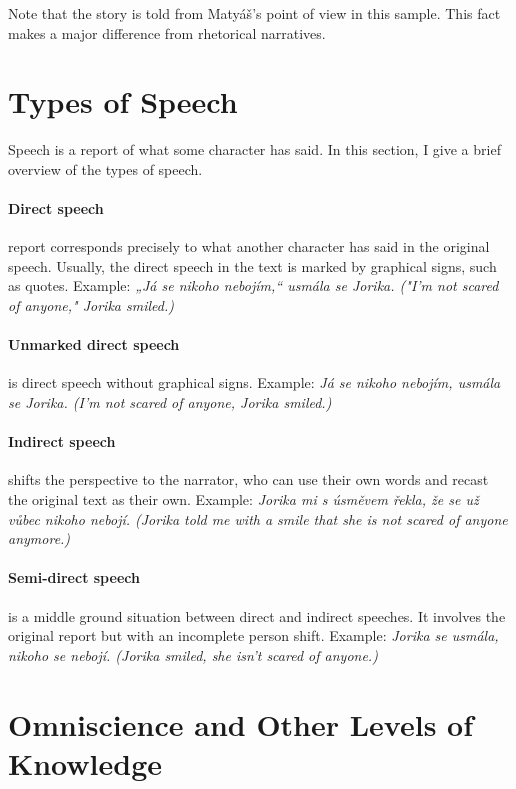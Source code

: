 Note that the story is told from Matyáš's point of view in this sample. This fact makes a major difference from rhetorical narratives.

\section{Types of Speech} \label{sec:speeches}

Speech is a report of what some character has said. In this section, I give a brief overview of the types of speech.

\paragraph{Direct speech} report corresponds precisely to what another character has said in the original speech. \cite{ChapterNine} Usually, the direct speech in the text is marked by graphical signs, such as quotes. Example: \emph{„Já se nikoho nebojím,“ usmála se Jorika. ("I'm not scared of anyone," Jorika smiled.)}

\paragraph{Unmarked direct speech} is direct speech without graphical signs. Example: \emph{Já se nikoho nebojím, usmála se Jorika. (I'm not scared of anyone, Jorika smiled.)}

\paragraph{Indirect speech} shifts the perspective to the narrator, who can use their own words and recast the original text as their own. \cite{ChapterNine} Example: \emph{Jorika mi s úsměvem řekla, že se už vůbec nikoho nebojí. (Jorika told me with a smile that she is not scared of anyone anymore.)}

\paragraph{Semi-direct speech} is a middle ground situation between direct and indirect speeches. It involves the original report but with an incomplete person shift. \cite{ChapterNine} Example: \emph{Jorika se usmála, nikoho se nebojí. (Jorika smiled, she isn't scared of anyone.)}

\section{Omniscience and Other Levels of Knowledge}

